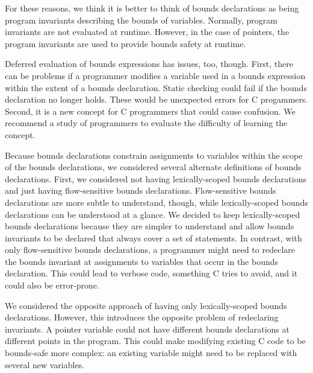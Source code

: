 For these reasons, we think it is better to think of bounds declarations as being
program invariants describing the bounds of variables.   Normally, 
program invariants are not evaluated at runtime.  However, in the case of pointers,
the program invariants are used to provide bounds safety at runtime.

Deferred evaluation of bounds expressions has issues, too, though. First, there
can be problems if a programmer modifies a variable used in a bounds expression
within the extent of a bounds declaration.  Static checking could fail if the
bounds declaration no longer holds.  These would be unexpected errors for
C progammers.  Second, it is a new concept for C programmers that could
cause confusion.  We recommend a study of
programmers to evaluate the difficulty of learning the concept.

Because bounds declarations constrain assignments to variables within the scope
of the bounds declarations, we considered several alternate definitions of 
bounds declarations.   First, we considered not having lexically-scoped bounds
declarations and just having flow-sensitive bounds declarations.  Flow-sensitive
bounds declarations are more subtle to understand, though, while lexically-scoped
bounds declarations can be understood at a glance.  We decided to keep
lexically-scoped bounds declarations because they are simpler to understand and
allow bounds invariants to be declared that always cover a set of statements.
In contrast, with only flow-sensitive bounds declarations, a programmer might need 
to redeclare the bounds invariant at  assignments to variables that occur in the
bounds declaration. This could lead to verbose code, something C tries to
avoid, and it could also be error-prone.

We considered the opposite approach of having only lexically-scoped
bounds declarations.   However, this introduces the opposite problem of
redeclaring invariants.  A pointer variable could not have different
bounds declarations at different points in the program.  This could
make modifying existing C code to be bounds-safe more complex: an existing
variable might need to be replaced with several new variables.

